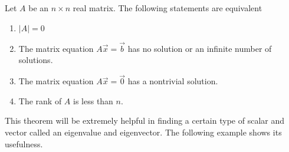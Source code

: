 \begin{theorem} \label{thm:sing:matrices}

Let $A$ be an $n \times n$ real matrix.  The following statements are equivalent

\begin{enumerate}
\item $|A|=0$
\item The matrix equation $A \vec{x} = \vec{b}$ has no solution or an infinite number of solutions.
\item The matrix equation $A \vec{x} = \vec{0}$ has a nontrivial solution.
\item The rank of $A$ is less than $n$.
\end{enumerate}

\end{theorem}


This theorem will be extremely helpful in finding a certain type of scalar and vector called an eigenvalue and eigenvector.  The following example shows its usefulness.

